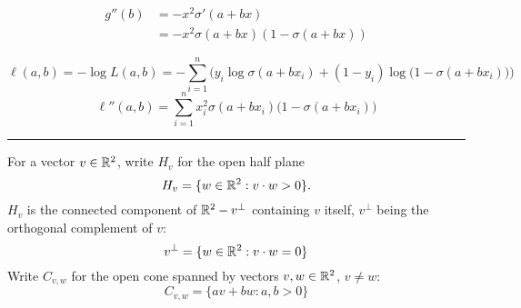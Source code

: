 \documentclass[12pt]{amsart}
\begin{document}
\begin{align*}
    g''(b) &= -x^2\sigma'(a + bx)\\
    &= -x^2\sigma(a + bx)(1-\sigma(a + bx))
\end{align*}

\[
    \ell(a,b) = -\log L(a,b) = -\sum_{i=1}^n\Big(y_i\log\sigma(a + bx_i) + (1-y_i)\log\big(1-\sigma(a + bx_i)\big)\Big)
\]
\[
    \ell''(a,b) = \sum_{i=1}^nx_i^2\sigma(a + bx_i)\big(1-\sigma(a + bx_i)\big)
\]
\bigskip
\hrule
\bigskip

For a vector $v\in\mathbb{R}^2$, write $H_v$ for the open half plane
\[
    H_v = \{w\in\mathbb{R}^2 : v\cdot w > 0\}.
\]
$H_v$ is the connected component of $\mathbb{R}^2 - v^\perp$ containing $v$ itself,
$v^\perp$ being the orthogonal complement of $v$:
\[
    v^\perp = \{w\in\mathbb{R}^2 : v\cdot w = 0\}
\]
Write $C_{v,w}$ for the open cone spanned by vectors $v, w\in\mathbb{R}^2$, $v\neq w$:
\[
    C_{v,w} = \{av + bw : a,b>0\}
\]
\end{document}
